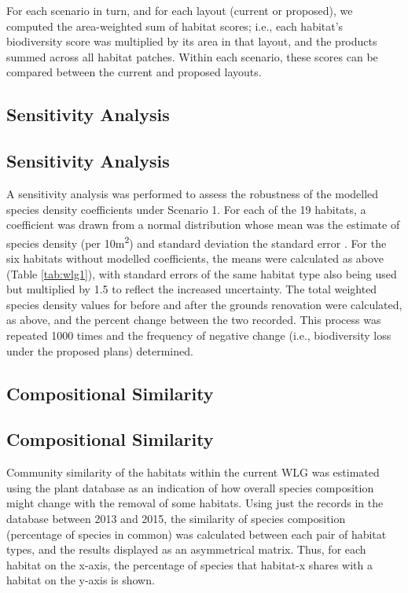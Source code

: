 For each scenario in turn, and for each layout (current or proposed), we computed the area-weighted sum of habitat scores; i.e., each habitat's biodiversity score was multiplied by its area in that layout, and the products summed across all habitat patches. Within each scenario, these scores can be compared between the current and proposed layouts.

\ifappendixStyle %
\subsection{Sensitivity Analysis}%
\else
\subsection*{Sensitivity Analysis}
\fi

A sensitivity analysis was performed to assess the robustness of the modelled species density coefficients under Scenario 1. For each of the 19 habitats, a coefficient was drawn from a normal distribution whose mean was the estimate of species density (per 10m\textsuperscript{2}) and standard deviation the standard error \citep{Newbold:2015nat}. For the six habitats without modelled coefficients, the means were calculated as above (Table \ref{tab:wlg1}), with standard errors of the same habitat type also being used but multiplied by 1.5 to reflect the increased uncertainty. The total weighted species density values for before and after the grounds renovation were calculated, as above, and the percent change between the two recorded. This process was repeated 1000 times and the frequency of negative change (i.e., biodiversity loss under the proposed plans) determined.

\ifappendixStyle %
\subsection{Compositional Similarity}%
\else
\subsection*{Compositional Similarity}
\fi

Community similarity of the habitats within the current WLG was estimated using the plant database as an indication of how overall species composition might change with the removal of some habitats. Using just the records in the database between 2013 and 2015, the similarity of species composition (percentage of species in common) was calculated between each pair of habitat types, and the results displayed as an asymmetrical matrix. Thus, for each habitat on the x-axis, the percentage of species that habitat-x shares with a habitat on the y-axis is shown.

